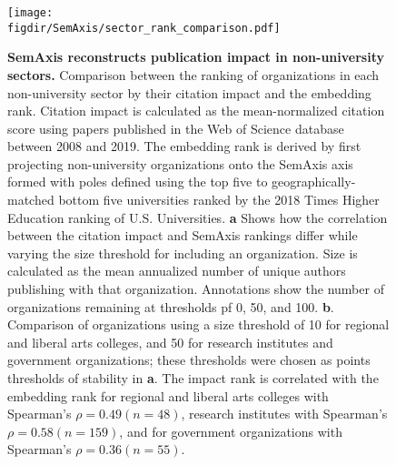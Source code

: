 \documentclass[12pt]{article} %
\def\figdir{../Figs}
\begin{document}
%
%
\begin{figure}[hp!]
	\centering
	\texttt{[image: \\figdir/SemAxis/sector\_rank\_comparison.pdf]}
	\caption{
		\textbf{SemAxis reconstructs publication impact in non-university sectors.}
		Comparison between the ranking of organizations in each non-university sector by their citation impact and the embedding rank.
		Citation impact is calculated as the mean-normalized citation score using papers published in the Web of Science database between 2008 and 2019. 
		The embedding rank is derived by first projecting non-university organizations onto the SemAxis axis formed with poles defined using the top five to geographically-matched bottom five universities ranked by the 2018 Times Higher Education ranking of U.S. Universities.
		\textbf{a} Shows how the correlation between the citation impact and SemAxis rankings differ while varying the size threshold for including an organization.
		Size is calculated as the mean annualized number of unique authors publishing with that organization. 
		Annotations show the number of organizations remaining at thresholds pf 0, 50, and 100. 
		\textbf{b}. Comparison of organizations using a size threshold of 10 for regional and liberal arts colleges, and 50 for research institutes and government organizations;
		these thresholds were chosen as points thresholds of stability in \textbf{a}. 		
		The impact rank is correlated with the embedding rank for regional and liberal arts colleges with Spearman's $\rho = 0.49 (n = 48)$, research institutes with Spearman's $\rho = 0.58 (n = 159)$, and for government organizations with Spearman's $\rho = 0.36 (n = 55)$. 
	}
	\label{fig:supp:sector_semaxis_impact}
\end{figure}


%
%
\end{document}
